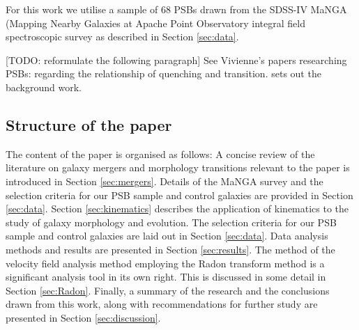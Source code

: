 For this work we utilise a sample of 68 PSBs drawn from the SDSS-IV MaNGA (Mapping Nearby Galaxies at Apache Point Observatory integral field spectroscopic survey  as described in Section \ref{sec:data}.

[TODO: reformulate the following paragraph] See Vivienne's  papers researching PSBs: \citet{2017MNRAS.472.1401A} regarding the relationship of quenching and transition. \citet{2016MNRAS.463..832W} sets out the background work.



\subsection{Structure of the paper}
The content of the paper is organised as follows: A concise review of the literature on galaxy mergers and morphology transitions relevant to the paper is introduced in Section \ref{sec:mergers}. Details of the MaNGA survey and the selection criteria for our PSB sample and control galaxies are provided in Section \ref{sec:data}. Section \ref{sec:kinematics} describes the application of kinematics to the study of galaxy morphology and evolution. The selection criteria for our PSB sample and control galaxies are laid out in Section \ref{sec:data}. Data analysis methods and results are presented in Section \ref{sec:results}. The method of the velocity field analysis method employing the Radon transform method is a significant analysis tool in its own right. This is discussed in some detail in Section \ref{sec:Radon}. Finally, a summary of the research and the conclusions drawn from this work, along with recommendations for further study are presented in Section \ref{sec:discussion}.
